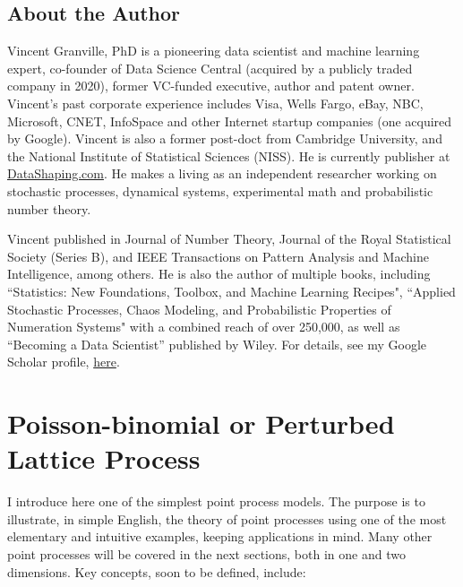 \documentclass[10pt]{article}
\begin{document}
\subsection*{About the Author}\label{sec:vg}

Vincent Granville, PhD is a pioneering data scientist and machine learning expert, co-founder of Data Science Central (acquired by a publicly traded company in 2020), former VC-funded executive, author and patent owner. Vincent's past corporate experience includes Visa, Wells Fargo, eBay, NBC, Microsoft, CNET, InfoSpace and other Internet startup companies (one acquired by Google). Vincent is also a former post-doct from Cambridge University, and the National Institute of Statistical Sciences (NISS). He is currently publisher at \href{http://www.datashaping.com}{DataShaping.com}. He makes a living as an independent researcher working on stochastic processes, dynamical systems, experimental math and probabilistic number theory. 

Vincent published in Journal of Number Theory, Journal of the Royal Statistical Society (Series B), and IEEE Transactions on Pattern Analysis and Machine Intelligence, among others. He is also the author of multiple  books, including ``Statistics: New Foundations, Toolbox, and Machine Learning Recipes", ``Applied Stochastic Processes, Chaos Modeling, and Probabilistic Properties of Numeration Systems" with a combined reach of over 250,000, as well as ``Becoming a Data Scientist'' published by Wiley.
For details, see my Google Scholar profile, \href{https://scholar.google.com/citations?user=pWFKWPMAAAAJ&hl=en}{here}.

\pagebreak

\section{Poisson-binomial or Perturbed Lattice Process}

I introduce here one of the simplest point process models. The purpose is to illustrate, in simple English, the theory of point processes using one of the most elementary and intuitive examples, keeping applications in mind. Many other point processes will be covered in the next sections, both in one and two dimensions. Key concepts, soon to be defined, include: 
\vspace{1ex} \\
\end{document}
